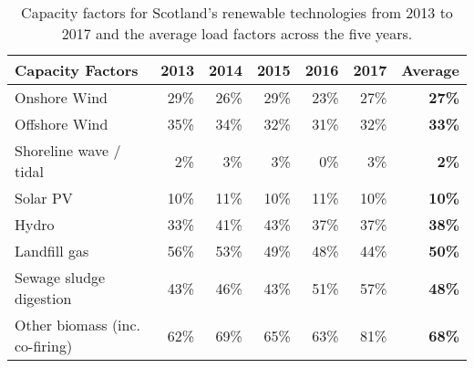 \begin{table}[H]
	\caption{Capacity factors for Scotland's renewable technologies from 2013 to 2017 \citep{BEIS2018REs} and the average load factors across the five years.}
	\label{tbl:CFs}
	\centering
	\begin{tabular}{@{}lrrrrrr@{}}
		\toprule
		Capacity Factors & 2013 & 2014 & 2015 & 2016 & 2017 & \textbf{Average} \\ \midrule
		Onshore Wind & 29\% & 26\% & 29\% & 23\% & 27\% & \textbf{27\%} \\
		Offshore Wind & 35\% & 34\% & 32\% & 31\% & 32\% & \textbf{33\%} \\
		Shoreline wave / tidal & 2\% & 3\% & 3\% & 0\% & 3\% & \textbf{2\%} \\
		Solar PV & 10\% & 11\% & 10\% & 11\% & 10\% & \textbf{10\%} \\
		Hydro & 33\% & 41\% & 43\% & 37\% & 37\% & \textbf{38\%} \\
		Landfill gas & 56\% & 53\% & 49\% & 48\% & 44\% & \textbf{50\%} \\
		Sewage sludge digestion & 43\% & 46\% & 43\% & 51\% & 57\% & \textbf{48\%} \\
		Other biomass (inc. co-firing) & 62\% & 69\% & 65\% & 63\% & 81\% & \textbf{68\%} \\ \bottomrule
	\end{tabular}
\end{table}